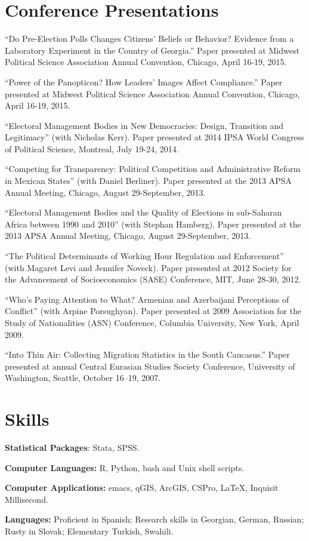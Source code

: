 \documentclass[margin,line]{res}
\begin{document}
{\begin{resume}
\section{\sc Conference Presentations}
``Do Pre-Election Polls Changes Citizens' Beliefs or Behavior?
Evidence from a Laboratory Experiment in the Country of Georgia.''
Paper presented at Midwest Political Science Association Annual
Convention, Chicago, April 16-19, 2015.

``Power of the Panopticon? How Leaders' Images Affect Compliance.''
Paper presented at Midwest Political Science Association Annual
Convention, Chicago, April 16-19, 2015.

``Electoral Management Bodies in New Democracies:
Design, Transition and Legitimacy'' (with Nicholas Kerr). Paper
presented at 2014 IPSA World Congress of Political Science, Montreal, July 19-24, 2014. 

``Competing for Transparency: Political Competition and Administrative
Reform in Mexican States'' (with Daniel Berliner). Paper presented at
the 2013 APSA Annual Meeting, Chicago, August 29-September, 2013.

``Electoral Management Bodies and the Quality of Elections in
 sub-Saharan Africa between 1990 and 2010'' (with Stephan Hamberg).
Paper presented at
the 2013 APSA Annual Meeting, Chicago, August 29-September, 2013.

 ``The Political Determinants of Working Hour Regulation and Enforcement'' (with Magaret Levi and Jennifer Noveck). Paper presented at 2012 Society for the Advancement of
Socioeconomics (SASE) Conference, MIT, June 28-30, 2012.

``Who's Paying Attention to What? Armenian
 and Azerbaijani Perceptions of Conflict''  (with Arpine Porsughyan). Paper presented at 2009
 Association for the Study of Nationalities (ASN) Conference, Columbia
 University, New York, April 2009.

``Into Thin Air: Collecting Migration Statistics in the South
Caucasus.'' Paper presented at annual Central Eurasian Studies
Society Conference, University of Washington, Seattle, October 16--19, 2007.

\section{\sc Skills} 
\textbf{Statistical Packages}:  Stata, SPSS. \par\smallskip
\textbf{Computer Languages:} R, Python, bash and Unix shell scripts. \par\smallskip
\textbf{Computer Applications:} emacs, qGIS, ArcGIS, CSPro,  \LaTeX, Inquisit Millisecond.\par\smallskip
\textbf{Languages:} Proficient in Spanish; Research skills in
  Georgian, German, Russian; Rusty in Slovak; Elementary Turkish, Swahili.


\end{resume}}
\end{document}
